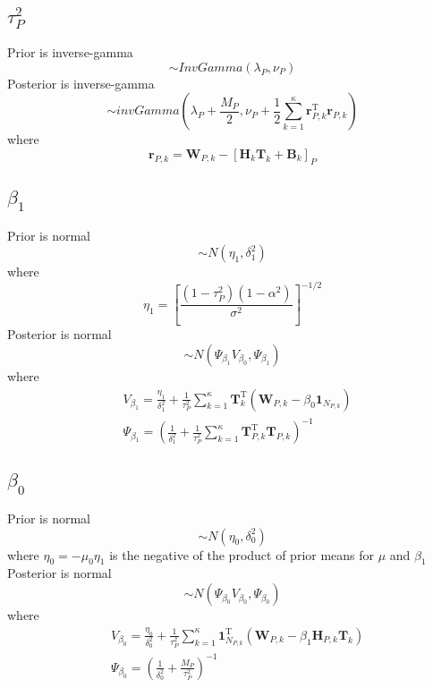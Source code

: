 \documentclass[12pt, letterpaper]{article}
\begin{document}
\subsection{$\tau_P^2$}
Prior is inverse-gamma
\begin{equation}
	\sim InvGamma \left(\lambda_{P}, \nu_{P}\right)
\end{equation}
Posterior is inverse-gamma
\begin{equation}
\sim  invGamma \left(\lambda_{P}+\frac{M_{P}}{2}, \nu_{P}+\frac{1}{2} \sum_{k=1}^{\kappa} \mathbf{r}_{P, k}^{\mathrm{T}} \mathbf{r}_{P, k}\right)
\end{equation}
where
\begin{equation}
\mathbf{r}_{P, k}=\mathbf{W}_{P, k}-\left[\mathbf{H}_{k} \mathbf{T}_{k}+\mathbf{B}_{k}\right]_{P}
\end{equation}

\subsection{$\beta_1$}
Prior is normal
\begin{equation}
	\sim N\left(\eta_{1}, \delta_{1}^{2}\right)
\end{equation}
where
\begin{equation}
	\eta_{1}=\left[\frac{\left(1-\tau_{P}^{2}\right)\left(1-\alpha^{2}\right)}{\sigma^{2}}\right]^{-1 / 2}
\end{equation}
Posterior is normal
\begin{equation}
	\sim N\left(\Psi_{\beta_{1}} V_{\beta_{0}}, \Psi_{\beta_{1}}\right)
\end{equation}
where
\begin{align}
&V_{\beta_{1}}=\frac{\eta_{1}}{\delta_{1}^{2}}+\frac{1}{\tau_{P}^{2}} \sum_{k=1}^{\kappa} \mathbf{T}_{k}^{\mathrm{T}}\left(\mathbf{W}_{P, k}-\beta_{0} \mathbf{1}_{N_{P, k}}\right) \\
&\Psi_{\beta_{1}}=\left(\frac{1}{\delta_{1}^{2}}+\frac{1}{\tau_{P}^{2}} \sum_{k=1}^{\kappa} \mathbf{T}_{P, k}^{\mathrm{T}} \mathbf{T}_{P, k}\right)^{-1}
\end{align}

\subsection{$\beta_0$}
Prior is normal
\begin{equation}
	\sim N\left(\eta_{0}, \delta_{0}^{2}\right)
\end{equation}
where $\eta_{0}=-\mu_0\eta_{1}$ is the negative of the product of prior means
for $\mu$ and $\beta_1$\\
Posterior is normal
\begin{equation}
	\sim N\left(\Psi_{\beta_{0}} V_{\beta_{0}}, \Psi_{\beta_{0}}\right)
\end{equation}
where
\begin{align}
&V_{\beta_{0}}=\frac{\eta_{0}}{\delta_{0}^{2}}+\frac{1}{\tau_{P}^{2}} \sum_{k=1}^{\kappa} \mathbf{1}_{N_{P, k}}^{\mathrm{T}}\left(\mathbf{W}_{P, k}-\beta_{1} \mathbf{H}_{P, k} \mathbf{T}_{k}\right) \\
&\Psi_{\beta_{0}}=\left(\frac{1}{\delta_{0}^{2}}+\frac{M_{P}}{\tau_{P}^{2}}\right)^{-1}
\end{align}
\end{document}
